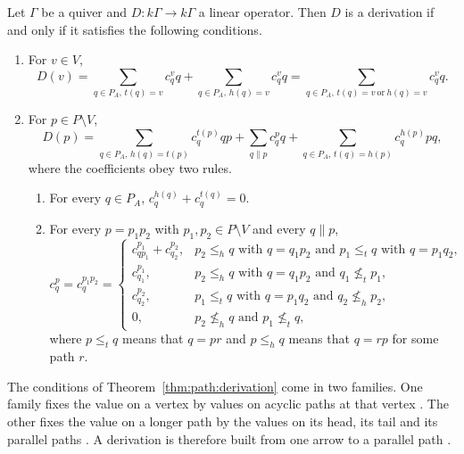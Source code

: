 \begin{theorem}\label{thm:path:derivation}
Let $\Gamma$ be a quiver and $D\colon k\Gamma\to k\Gamma$ a linear operator. Then
$D$ is a derivation if and only if it satisfies the following conditions.
\begin{enumerate}[label=(\alph*)]
\item For $v\in V$,
\begin{equation*}
D(v)=\sum_{q\in P_{A},\,t(q)=v}c^{v}_{q}q+\sum_{q\in P_{A},\,h(q)=v}c^{v}_{q}q
=\sum_{q\in P_{A},\,t(q)=v\ \text{or}\ h(q)=v}c^{v}_{q}q .
\end{equation*}
\item For $p\in P\setminus V$,
\begin{equation*}
D(p)=\sum_{q\in P_{A},\,h(q)=t(p)}c^{t(p)}_{q}qp
+\sum_{q\parallel p}c^{p}_{q}q
+\sum_{q\in P_{A},\,t(q)=h(p)}c^{h(p)}_{q}pq,
\end{equation*}
where the coefficients obey two rules.
\begin{enumerate}[label=(\roman*)]
\item For every $q\in P_{A}$, $c^{h(q)}_{q}+c^{t(q)}_{q}=0$.
\item For every $p=p_{1}p_{2}$ with $p_{1},p_{2}\in P\setminus V$ and every
$q\parallel p$,
\begin{equation*}
c^{p}_{q}=c^{p_{1}p_{2}}_{q}=
\begin{cases}
c^{p_{1}}_{qp_{1}}+c^{p_{2}}_{q_{2}},
  & p_{2}\le_{h}q\text{ with }q=q_{1}p_{2}\text{ and }p_{1}\le_{t}q\text{ with }q=p_{1}q_{2},\\
c^{p_{1}}_{q_{1}},
  & p_{2}\le_{h}q\text{ with }q=q_{1}p_{2}\text{ and }q_{1}\not\le_{t}p_{1},\\
c^{p_{2}}_{q_{2}},
  & p_{1}\le_{t}q\text{ with }q=p_{1}q_{2}\text{ and }q_{2}\not\le_{h}p_{2},\\
0, & p_{2}\not\le_{h}q\text{ and }p_{1}\not\le_{t}q,
\end{cases}
\end{equation*}
where $p\le_{t}q$ means that $q=pr$ and $p\le_{h}q$ means that $q=rp$ for some
path $r$.
\end{enumerate}
\end{enumerate}
\end{theorem}

The conditions of Theorem~\ref{thm:path:derivation} come in two families. One family
fixes the value on a vertex by values on acyclic paths at that vertex
\cite[p.~549]{GuoLi2014}. The other fixes the value on a longer path by the values
on its head, its tail and its parallel paths \cite[p.~549]{GuoLi2014}. A derivation
is therefore built from one arrow to a parallel path
\cite[pp.~553--554]{GuoLi2014}.

